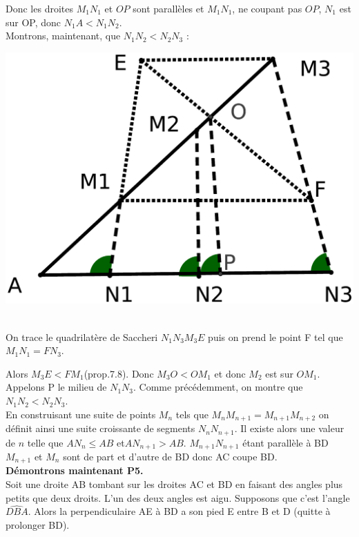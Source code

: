 \documentclass[a4paper, 12pt, twoside]{book}
\begin{document}
  
 Donc les droites $M_{1}N_{1}$ et $OP$ sont parallèles et $M_{1}N_{1}$, ne coupant pas $OP$, $N_{1}$ est sur OP, donc $N_{1}A<N_{1}N_{2}$. \\
 
 
 Montrons, maintenant, que $N_{1}N_{2}<N_{2}N_{3}$ :
 
 
 
 \includegraphics[scale=0.1]{figures/sacc14.eps} \
 
 On trace le quadrilatère de Saccheri $N_{1}N_{3}M_{3}E$ puis on prend le point F tel que $M_{1}N_{1}=FN_{3}$.\
 
 Alors $M_{3}E<FM_{1}$(prop.7.8). Donc $M_{3}O<OM_{1}$ et donc $M_{2}$ est sur $OM_{1}$. Appelons P le milieu de $N_{1}N_{3}$. Comme précédemment, on montre que $N_{1}N_{2}<N_{2}N_{3}$.\\
 
 

 
  En construisant une suite de points $M_{n}$ tels que $M_{n}M_{n+1}=M_{n+1}M_{n+2}$ on définit ainsi une suite croissante de segments  $N_{n}N_{n+1}$. Il existe alors une valeur de $n$ telle que $AN_{n}\leq AB$ et$AN_{n+1}> AB$. $M_{n+1}N_{n+1}$ étant parallèle à BD $M_{n+1}$ et $M_{n}$ sont de part et d'autre de BD donc AC coupe BD.\\
 
\textbf{Démontrons maintenant P5.}\\

 
 Soit une droite AB tombant sur les droites AC et BD en faisant des angles plus petits que deux droits. L'un des deux angles est aigu. Supposons que c'est l'angle $\hat{DBA}$. Alors la perpendiculaire AE à BD a son pied E entre B et D (quitte à prolonger BD).\
 
\end{document}
